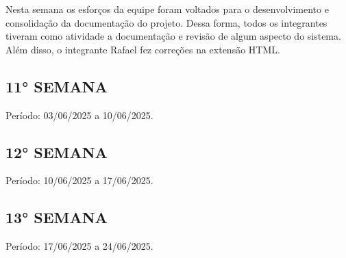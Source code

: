 \documentclass[
	12pt,				%
	openany,			%
	twoside,			%
	a4paper,			%
	english,			%
	french,				%
	spanish,			%
	brazil				%
	]{abntex2}
\begin{document}
\begin{apendicesenv}
Nesta semana os esforços da equipe foram voltados para o desenvolvimento e consolidação da documentação do projeto. 
Dessa forma, todos os integrantes tiveram como atividade a documentação e revisão de algum aspecto do sistema.  Além disso, o
integrante Rafael fez correções na extensão HTML.

\section{11° SEMANA}
Período: 03/06/2025 a 10/06/2025.

\section{12° SEMANA}
Período: 10/06/2025 a 17/06/2025.

\section{13° SEMANA}
Período: 17/06/2025 a 24/06/2025.


\chapter{}

\end{apendicesenv}



\begin{anexosenv}

\partanexos

\chapter{}


\end{anexosenv}

\printindex
\end{document}
